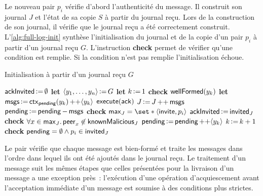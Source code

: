 Le nouveau pair $p_i$ vérifie d'abord l'authenticité du message.
Il construit son journal $J$ et l'état de sa copie $S$ à partir du journal reçu.
Lors de la construction de son journal, il vérifie que le journal reçu a été correctement construit.
L'\autoref{alg:full-log-init} synthèse l'initialisation du journal et de la copie d'un pair $p_i$ à partir d'un journal reçu $G$.
L'instruction \textbf{check} permet de vérifier qu'une condition est remplie.
Si la condition n'est pas remplie l'initialisation échoue.

\begin{algorithm}[ht]
\caption{Initialisation à partir d'un journal reçu $G$}\label{alg:full-log-init}
\begin{algorithmic}[1]
    \State $\trm{ackInvited} \assign \emptyset$
    \State \textbf{let} $\tuple*{y_1, \dotsc, y_n} \assign G$
    \State \textbf{let} $k \assign 1$
        \State \textbf{check} $\trm{wellFormed}(y_k)$
            \State \textbf{let} $\trm{msgs} \assign \trm{ctx}_{\trm{pending}}(y_k) \lappend \tuple*{y_k}$
                \State $\trm{execute}(\trm{ack})$
            \EndIf
            \State $J \assign J \lappend \trm{msgs}$
            \State $\trm{pending} \assign \trm{pending} \sminus \trm{msgs}$
                \State \textbf{check} $\trm{max}_J = \set*{\tuple*{\trm{invite}, p_i}}$
                \State $\trm{ackInvited} \assign \trm{invited}_J$
            \EndIf
            \State \textbf{check} $\forall x \in \trm{max}_J \qsep \trm{peer}_x \not\in \trm{knownMalicious}_J$
        \Else
            \State $\trm{pending} \assign \trm{pending} \lappend \tuple*{y_k}$
        \EndIf
        \State $k \assign k + 1$
    \EndWhile
    \State \textbf{check} $\trm{pending} = \emptyset \land p_i \in \trm{invited}_J$
\EndProcedure
\end{algorithmic}
\end{algorithm}

Le pair vérifie que chaque message est bien-formé et traite les messages dans l'ordre dans lequel ils ont été ajoutés dans le journal reçu.
Le traitement d'un message suit les mêmes étapes que celles présentées pour la livraison d'un message a une exception près~: l'exécution d'une opération d'acquiescement avant l'acceptation immédiate d'un message est soumise à des conditions plus strictes.

